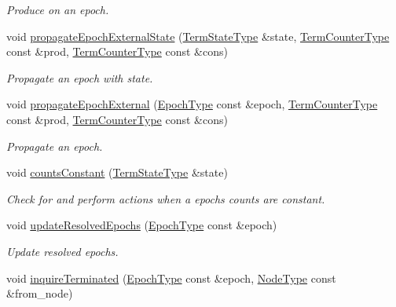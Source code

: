 \begin{DoxyCompactItemize}
\begin{DoxyCompactList}\small\item\em Produce on an epoch. \end{DoxyCompactList}\item 
void \hyperlink{structvt_1_1term_1_1_termination_detector_a233dc0ec4468f6e8006c959d613c28fd}{propagate\+Epoch\+External\+State} (\hyperlink{structvt_1_1term_1_1_term_action_ae4c635b69751d887666814700ed64d65}{Term\+State\+Type} \&state, \hyperlink{namespacevt_1_1term_a4fd378cdb0c36683afc1b3399d685f7f}{Term\+Counter\+Type} const \&prod, \hyperlink{namespacevt_1_1term_a4fd378cdb0c36683afc1b3399d685f7f}{Term\+Counter\+Type} const \&cons)
\begin{DoxyCompactList}\small\item\em Propagate an epoch with state. \end{DoxyCompactList}\item 
void \hyperlink{structvt_1_1term_1_1_termination_detector_a580b7ba3727a7358125cf217e9dcab19}{propagate\+Epoch\+External} (\hyperlink{namespacevt_a985a5adf291c34a3ca263b3378388236}{Epoch\+Type} const \&epoch, \hyperlink{namespacevt_1_1term_a4fd378cdb0c36683afc1b3399d685f7f}{Term\+Counter\+Type} const \&prod, \hyperlink{namespacevt_1_1term_a4fd378cdb0c36683afc1b3399d685f7f}{Term\+Counter\+Type} const \&cons)
\begin{DoxyCompactList}\small\item\em Propagate an epoch. \end{DoxyCompactList}\item 
void \hyperlink{structvt_1_1term_1_1_termination_detector_a9460b5236e34a5baa344b0ac814ce3c9}{counts\+Constant} (\hyperlink{structvt_1_1term_1_1_term_action_ae4c635b69751d887666814700ed64d65}{Term\+State\+Type} \&state)
\begin{DoxyCompactList}\small\item\em Check for and perform actions when a epoch\textquotesingle{}s counts are constant. \end{DoxyCompactList}\item 
void \hyperlink{structvt_1_1term_1_1_termination_detector_a7637035e3f3c0f898d8dc79bbc2d8bf4}{update\+Resolved\+Epochs} (\hyperlink{namespacevt_a985a5adf291c34a3ca263b3378388236}{Epoch\+Type} const \&epoch)
\begin{DoxyCompactList}\small\item\em Update resolved epochs. \end{DoxyCompactList}\item 
void \hyperlink{structvt_1_1term_1_1_termination_detector_a8a6c9a639b67a774e15c98d4b9d80166}{inquire\+Terminated} (\hyperlink{namespacevt_a985a5adf291c34a3ca263b3378388236}{Epoch\+Type} const \&epoch, \hyperlink{namespacevt_a866da9d0efc19c0a1ce79e9e492f47e2}{Node\+Type} const \&from\+\_\+node)

\end{DoxyCompactItemize}
